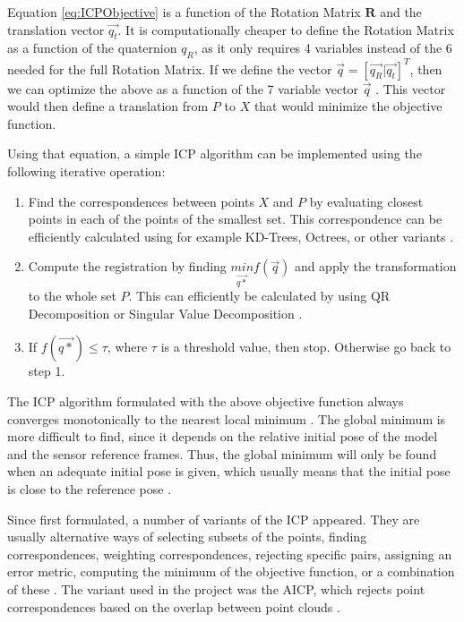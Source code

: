 \documentclass[11pt]{article}
\begin{document}
Equation \ref{eq:ICPObjective} is a function of the Rotation Matrix $\mathbf{R}$ and the translation vector $\overrightarrow{q_t}$. It is computationally cheaper to define the Rotation Matrix as a function of the quaternion $q_R$, as it only requires 4 variables instead of the 6 needed for the full Rotation Matrix. If we define the vector $\overrightarrow{q} = [\overrightarrow{q_R} | \overrightarrow{q_t}]^T$, then we can optimize the above as a function of the 7 variable vector $\overrightarrow{q}$ \cite{AMethodRegistration}. This vector would then define a translation from $P$ to $X$ that would minimize the objective function.
	
Using that equation, a simple ICP algorithm can be implemented using the following iterative operation:

\begin{enumerate}[leftmargin=.8in]
\item Find the correspondences between points $X$ and $P$ by evaluating closest points in each of the points of the smallest set. This correspondence can be efficiently calculated using for example KD-Trees, Octrees, or other variants \cite{KDT}.
\item Compute the registration by finding $\underset{\overrightarrow{q*}}{min}f(\overrightarrow{q})$ and apply the transformation to the whole set $P$. This can efficiently be calculated by using QR Decomposition or Singular Value Decomposition \cite{ICPVariants}.
\item If $f(\overrightarrow{q*}) \leq \tau$, where $\tau$ is a threshold value, then stop. Otherwise go back to step 1.
\end{enumerate}	
	
The ICP algorithm formulated with the above objective function always converges monotonically to the nearest local minimum \cite{AMethodRegistration}. The global minimum is more difficult to find, since it depends on the relative initial pose of the model and the sensor reference frames. Thus, the global minimum will only be found when an adequate initial pose is given, which usually means that the initial pose is close to the reference pose \cite{AMethodRegistration}.

Since first formulated, a number of variants of the ICP appeared. They are usually alternative ways of selecting subsets of the points, finding correspondences, weighting correspondences, rejecting specific pairs, assigning an error metric, computing the minimum of the objective function, or a combination of these \cite{ICPVariants}. The variant used in the project was the AICP, which rejects point correspondences based on the overlap between point clouds \cite{7989547}.
	
\end{document}
